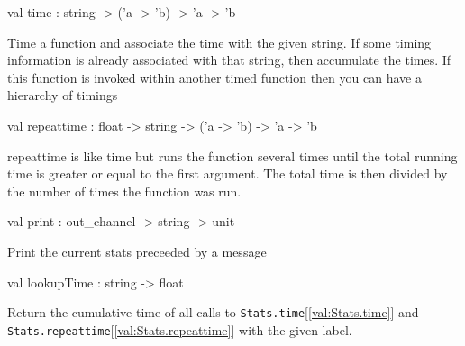 \documentclass[11pt]{article}
\begin{document}
\label{val:Stats.time}\begin{ocamldoccode}
val time : string -> ('a -> 'b) -> 'a -> 'b
\end{ocamldoccode}
\begin{ocamldocdescription}
Time a function and associate the time with the given string. If some
    timing information is already associated with that string, then accumulate
    the times. If this function is invoked within another timed function then
    you can have a hierarchy of timings


\end{ocamldocdescription}




\label{val:Stats.repeattime}\begin{ocamldoccode}
val repeattime : float -> string -> ('a -> 'b) -> 'a -> 'b
\end{ocamldoccode}
\begin{ocamldocdescription}
repeattime is like time but runs the function several times until the total
    running time is greater or equal to the first argument. The total time is
    then divided by the number of times the function was run.


\end{ocamldocdescription}




\label{val:Stats.print}\begin{ocamldoccode}
val print : out_channel -> string -> unit
\end{ocamldoccode}
\begin{ocamldocdescription}
Print the current stats preceeded by a message


\end{ocamldocdescription}




\label{val:Stats.lookupTime}\begin{ocamldoccode}
val lookupTime : string -> float
\end{ocamldoccode}
\begin{ocamldocdescription}
Return the cumulative time of all calls to {\tt{Stats.time}}[\ref{val:Stats.time}] and
  {\tt{Stats.repeattime}}[\ref{val:Stats.repeattime}] with the given label.


\end{ocamldocdescription}
\end{document}
